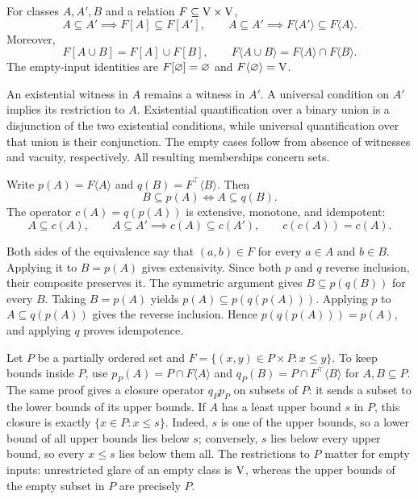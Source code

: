 \begin{proposition}
For classes $A,A',B$ and a relation $F\subseteq\mathrm{V}\times\mathrm{V}$,
\[
A\subseteq A'\implies F[A]\subseteq F[A'],
\qquad
A\subseteq A'\implies F\langle A'\rangle\subseteq F\langle A\rangle.
\]
Moreover,
\[
F[A\cup B]=F[A]\cup F[B],
\qquad
F\langle A\cup B\rangle=F\langle A\rangle\cap F\langle B\rangle.
\]
The empty-input identities are $F[\varnothing]=\varnothing$ and
$F\langle\varnothing\rangle=\mathrm{V}$.
\end{proposition}
\Proof
An existential witness in $A$ remains a witness in $A'$. A universal
condition on $A'$ implies its restriction to $A$. Existential
quantification over a binary union is a disjunction of the two
existential conditions, while universal quantification over that union
is their conjunction. The empty cases follow from absence of witnesses
and vacuity, respectively. All resulting memberships concern sets.
\Done

\begin{proposition}
Write $p(A)=F\langle A\rangle$ and
$q(B)=F^\top\langle B\rangle$. Then
\[
B\subseteq p(A)\iff A\subseteq q(B).
\]
The operator $c(A)=q(p(A))$ is extensive, monotone, and idempotent:
\[
A\subseteq c(A),\qquad
A\subseteq A'\implies c(A)\subseteq c(A'),\qquad
c(c(A))=c(A).
\]
\end{proposition}
\Proof
Both sides of the equivalence say that $(a,b)\in F$ for every $a\in A$
and $b\in B$. Applying it to $B=p(A)$ gives extensivity. Since both
$p$ and $q$ reverse inclusion, their composite preserves it.
The symmetric argument gives $B\subseteq p(q(B))$ for every $B$.
Taking $B=p(A)$ yields $p(A)\subseteq p(q(p(A)))$. Applying $p$ to
$A\subseteq q(p(A))$ gives the reverse inclusion. Hence
$p(q(p(A)))=p(A)$, and applying $q$ proves idempotence.
\Done

\begin{example}
Let $P$ be a partially ordered set and
$F=\{(x,y)\in P\times P:x\leq y\}$. To keep bounds inside $P$, use
$p_P(A)=P\cap F\langle A\rangle$ and
$q_P(B)=P\cap F^\top\langle B\rangle$ for $A,B\subseteq P$.
The same proof gives a closure operator $q_Pp_P$ on subsets of $P$:
it sends a subset to the lower bounds of its upper bounds.
If $A$ has a least upper bound $s$ in $P$, this closure is exactly
$\{x\in P:x\leq s\}$. Indeed, $s$ is one of the upper bounds, so a
lower bound of all upper bounds lies below $s$; conversely, $s$ lies
below every upper bound, so every $x\leq s$ lies below them all.
The restrictions to $P$ matter for empty inputs: unrestricted glare of
an empty class is $\mathrm{V}$, whereas the upper bounds of the empty subset
in $P$ are precisely $P$.
\end{example}

